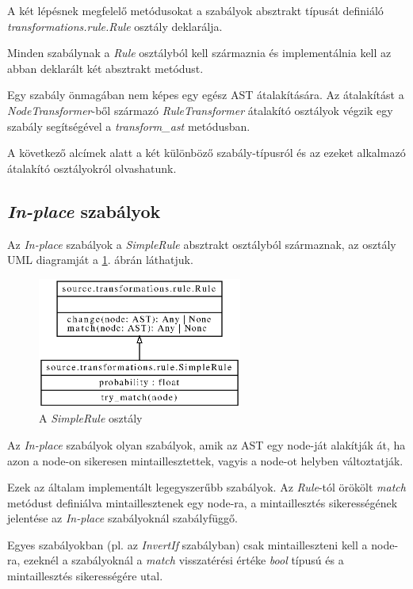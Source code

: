 A két lépésnek megfelelő metódusokat a szabályok absztrakt típusát definiáló
\emph{transformations.rule.Rule} osztály deklarálja.

Minden szabálynak a \emph{Rule} osztályból kell származnia és implementálnia kell
az abban deklarált két absztrakt metódust.

Egy szabály önmagában nem képes egy egész AST átalakítására.
Az átalakítást a \emph{NodeTransformer}-ből származó \emph{RuleTransformer}
átalakító osztályok végzik egy szabály segítségével a \emph{transform\_ast} metódusban.

A következő alcímek alatt a két különböző szabály-típusról és az ezeket alkalmazó
átalakító osztályokról olvashatunk.

\subsection{\emph{In-place} szabályok}

Az \emph{In-place} szabályok a \emph{SimpleRule} absztrakt osztályból származnak,
az osztály UML diagramját a \ref{fig:SimpleRule}. ábrán láthatjuk.

\begin{figure}[H]
	\centering
	\includegraphics[width=0.6\textwidth]{images/uml/SimpleRule.eps}
	\caption{A \emph{SimpleRule} osztály}
	\label{fig:SimpleRule}
\end{figure}

Az \emph{In-place} szabályok olyan szabályok, amik az AST egy node-ját alakítják át,
ha azon a node-on sikeresen mintaillesztettek, vagyis a node-ot helyben változtatják.

Ezek az általam implementált legegyszerűbb szabályok.
Az \emph{Rule}-tól örökölt \emph{match} metódust definiálva mintaillesztenek egy node-ra,
a mintaillesztés sikerességének jelentése az \emph{In-place} szabályoknál szabályfüggő.

Egyes szabályokban (pl. az \emph{InvertIf} szabályban) csak mintailleszteni kell a node-ra,
ezeknél a szabályoknál a \emph{match} visszatérési értéke \emph{bool} típusú
és a mintaillesztés sikerességére utal.

